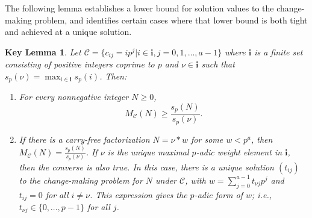 \documentclass{amsart}
\numberwithin{equation}{section}
\newcommand{\cC}{\mathcal{C}}
\newcommand{\bi}{\mathbf{i}}
\theoremstyle{plain}
\newtheorem{keylemma}[theorem]{Key Lemma}
\theoremstyle{definition}
\begin{document}
The following lemma establishes a lower bound for solution values to the
change-making problem, and identifies certain cases where that
lower bound is both tight and achieved at a unique solution.
\begin{keylemma}
    \label{L:key}   
    Let $\cC=\{c_{ij}=ip^j|i\in \bi,  j=0,1,\ldots, a-1\}$
    where $\bi$ is a finite set consisting of positive integers
    coprime to $p$ and $\nu\in\bi$ such that $s_p(\nu)=\max_{i\in\bi}s_p(i)$.
    Then:
\begin{enumerate}    
\item For every nonnegative integer $N\ge 0$,
    \begin{equation*}
        M_\cC(N) \ge \frac{s_p(N)}{s_p(\nu)}. 
    \end{equation*}
\item If there is a carry-free factorization $N = \nu * w$
    for some $w < p^a$, then $M_\cC(N) = \frac{s_p(N)}{s_p(\nu)}$.
    If $\nu$ is the unique maximal $p$-adic weight element in $\bi$,
    then the converse is also true.
    In this case, there is a unique solution $(t_{ij})$
    to the change-making problem for $N$ under $\cC$, with 
    $w = \sum_{j=0}^{a-1} t_{\nu j}p^j$ and $t_{ij} = 0$ for all $i\ne \nu$.
    This expression gives the $p$-adic form of $w$; i.e., $t_{\nu j} \in
    \{0,\dots, p-1\}$ for all $j$.
\end{enumerate}
\end{keylemma}      
      
\end{document}
